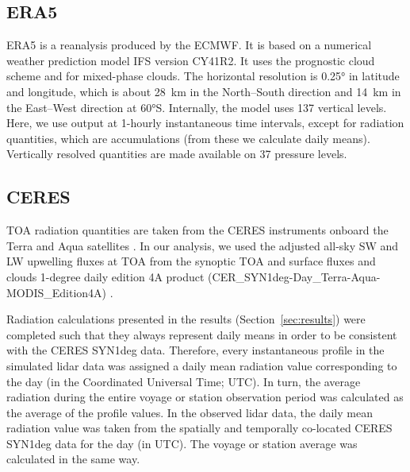 \documentclass[draft]{agujournal2019}
\begin{document}
\subsection{ERA5}

ERA5 \cite{era5} is a reanalysis produced by the ECMWF. It is based on a numerical weather prediction model IFS version CY41R2. It uses the  prognostic cloud scheme and  for mixed-phase clouds. The horizontal resolution is 0.25° in latitude and longitude, which is about 28~km in the North--South direction and 14~km in the East--West direction at 60°S. Internally, the model uses 137 vertical levels. Here, we use output at 1-hourly instantaneous time intervals, except for radiation quantities, which are accumulations (from these we calculate daily means). Vertically resolved quantities are made available on 37 pressure levels.

\subsection{CERES}
\label{sec:ceres}

TOA radiation quantities are taken from the CERES instruments onboard the Terra and Aqua satellites \cite{wielicki1996,loeb2018}. In our analysis, we used the adjusted all-sky SW and LW upwelling fluxes at TOA from the synoptic TOA and surface fluxes and clouds 1-degree daily edition 4A product (CER\_SYN1deg-Day\_Terra-Aqua-MODIS\_Edition4A) \cite{doelling2013,doelling2016}.

Radiation calculations presented in the results (Section~\ref{sec:results}) were completed such that they always represent daily means in order to be consistent with the CERES SYN1deg data. Therefore, every instantaneous profile in the simulated lidar data was assigned a daily mean radiation value corresponding to the day (in the Coordinated Universal Time; UTC). In turn, the average radiation during the entire voyage or station observation period was calculated as the average of the profile values. In the observed lidar data, the daily mean radiation value was taken from the spatially and temporally co-located CERES SYN1deg data for the day (in UTC). The voyage or station average was calculated in the same way.
\end{document}
